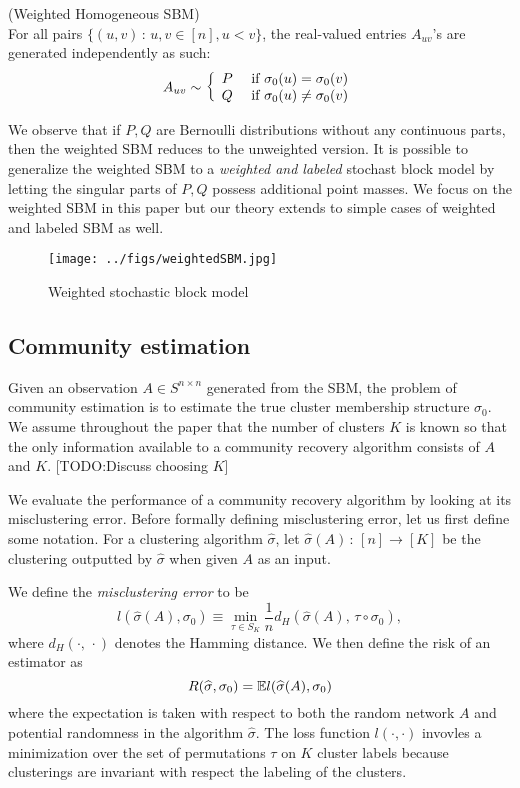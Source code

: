 \documentclass{article}
\begin{document}
\begin{definition} (Weighted Homogeneous SBM)\\
For all pairs $\{ (u, v) \,:\, u,v \in [n], u < v \}$, the real-valued entries $A_{uv}$'s are generated independently as such: 
\begin{align*}
A_{uv} \sim \left\{ 
   \begin{array}{cc} 
   P & \textrm{ if } \sigma_0(u) = \sigma_0(v) \\
   Q & \textrm{ if } \sigma_0(u) \neq \sigma_0(v)
   \end{array} \right.
\end{align*}
\end{definition}

We observe that if $P, Q$ are Bernoulli distributions without any continuous parts, then the weighted SBM reduces to the unweighted version. It is possible to generalize the weighted SBM to a \emph{weighted and labeled} stochast block model by letting the singular parts of $P, Q$ possess additional point masses. We focus on the weighted SBM in this paper but our theory extends to simple cases of weighted and labeled SBM as well.


\begin{figure}[htp]
\centering
\texttt{[image: ../figs/weightedSBM.jpg]}
\caption{Weighted stochastic block model}
\label{fig:weighted_stochastic_block_model}
\end{figure}


\subsection{Community estimation}

Given an observation $A \in S^{n \times n}$ generated from the SBM, the problem of community estimation is to estimate the true cluster membership structure $\sigma_0$. We assume throughout the paper that the number of clusters $K$ is known so that the only information available to a community recovery algorithm consists of $A$ and $K$. [TODO:Discuss choosing $K$]

We evaluate the performance of a community recovery algorithm by looking at its misclustering error. Before formally defining misclustering error, let us first define some notation. For a clustering algorithm $\hat{\sigma}$, let $\hat{\sigma}(A) \,:\, [n] \rightarrow [K]$ be the clustering outputted by $\hat{\sigma}$ when given $A$ as an input. 

\begin{definition}
We define the \emph{misclustering error } to be
\[
l(\hat{\sigma}(A), \sigma_0) \equiv \min_{\tau \in S_K} \frac{1}{n} d_H(\hat{\sigma}(A),\, \tau \circ \sigma_0 ),
\]
where $d_H(\cdot, \, \cdot)$ denotes the Hamming distance. We then define the risk of an estimator as
\[
  R(\widehat{\sigma}, \sigma_0) = {\mathbb E} l(\widehat{\sigma}(A), \sigma_0)
\]
where the expectation is taken with respect to both the random network $A$ and potential randomness in the algorithm $\hat{\sigma}$. The loss function $l(\cdot, \cdot)$ invovles a minimization over the set of permutations $\tau$ on $K$ cluster labels because clusterings are invariant with respect the labeling of the clusters.
\end{definition}
\end{document}
